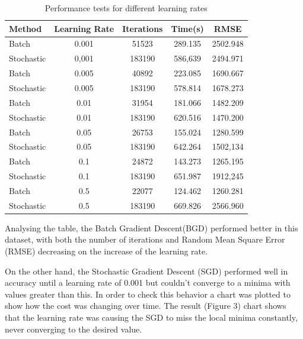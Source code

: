 \documentclass[conference]{IEEEtran}
\begin{document}
	  \begin{table}[h!]
    \begin{center}
      \caption{Performance tests for different learning rates}
      \label{table:table1}
      \begin{tabular}{l|c|c|c|c}
        Method & Learning Rate & Iterations & Time(s) & RMSE\\
        \hline
        Batch & 0.001 & 51523 & 289.135 & 2502.948 \\
        Stochastic & 0,001 & 183190 & 586,639 & 2494.971 \\
        Batch & 0.005 & 40892 & 223.085 & 1690.667 \\
        Stochastic & 0.005 & 183190 & 578.814 & 1678.273 \\
        Batch & 0.01 & 31954 & 181.066 & 1482.209 \\
        Stochastic & 0.01 & 183190 & 620.516 & 1470.200 \\
        Batch & 0.05 & 26753 & 155.024 & 1280.599 \\
        Stochastic & 0.05 & 183190 & 642.264 & 1502,134 \\
        Batch & 0.1 & 24872 & 143.273 & 1265.195 \\
        Stochastic & 0.1 & 183190 & 651.987 & 1912,245 \\
        Batch & 0.5 & 22077 & 124.462 & 1260.281 \\
        Stochastic & 0.5 & 183190 & 669.826 & 2566.960 \\
    \end{tabular}
  \end{center}
\end{table}	
	
	Analysing the table, the Batch Gradient Descent(BGD) performed better in this dataset, with  both the number of iterations and Random Mean Square Error (RMSE) decreasing on the increase of the learning rate.
	
	On the other hand, the Stochastic Gradient Descent (SGD) performed well in accuracy until a learning rate of 0.001 but couldn't converge to a minima with values greater than this. In order to check this behavior a chart was plotted to show how the cost was changing over time. The result (Figure 3) chart shows that the learning rate was causing the SGD to miss the local minima constantly, never converging to the desired value.
	
\end{document}

